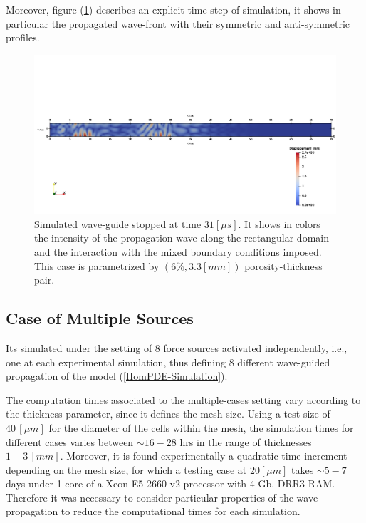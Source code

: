 Moreover, figure (\ref{Sim2D-TimeStep}) describes an explicit time-step of simulation, it shows in particular the propagated wave-front with their symmetric and anti-symmetric profiles.
\begin{figure}[!h]
	\centering
	\includegraphics[width=\textwidth]{images/ImgExt/SimP6TransIso33M780T310.png}
	\caption{Simulated wave-guide stopped at time $31 [\mu s]$. It shows in colors the intensity of the propagation wave along the rectangular domain and the interaction with the mixed boundary conditions imposed. This case is parametrized by $(6\%, 3.3 [mm])$ porosity-thickness pair.}
	\label{Sim2D-TimeStep}
\end{figure}



\subsection{Case of Multiple Sources}
Its simulated under the setting of 8 force sources activated independently, i.e., one at each experimental simulation, thus defining 8 different wave-guided propagation of the model (\ref{HomPDE-Simulation}).

\begin{rem}
The computation times associated to the multiple-cases setting vary according to the thickness parameter, since it defines the mesh size. Using a test size of $40 \, [\mu m]$ for the diameter of the cells within the mesh, the simulation times for different cases varies between $\sim 16-28$ hrs in the range of thicknesses $1-3 \, [mm]$. Moreover, it is found experimentally a quadratic time increment depending on the mesh size, for which a testing case at $20 [\mu m]$ takes $\sim 5-7$ days under 1 core of a Xeon E5-2660 v2 processor with 4 Gb. DRR3 RAM. 
Therefore it was necessary to consider particular properties of the wave propagation to reduce the computational times for each simulation.
\end{rem}

